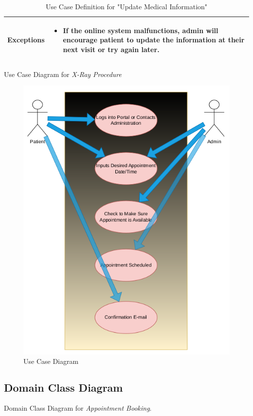 \documentclass{article}
\begin{document}
\begin{enumerate}
\begin{table}[H]
\begin{tabularx}{\textwidth}{|l|X|}
        \hline
        \textbf{Exceptions} & 
        \begin{itemize}
            \item If the online system malfunctions, admin will encourage patient to update the information at their next visit or try again later.
        \end{itemize} \\
        \hline
    \end{tabularx}
    \caption{Use Case Definition for "Update Medical Information"}
    \label{tab:use-case-update}
\end{table}

\newpage
Use Case Diagram for \textit{X-Ray Procedure}

\begin{figure}[H]
  \centering
  \includegraphics[width=0.8\linewidth]{../images/use_case_diagram_pcp.png}
  \caption{Use Case Diagram}
\end{figure}
\newpage
\subsection{Domain Class Diagram}

Domain Class Diagram for \textit{Appointment Booking}.


\end{enumerate}
\end{document}
